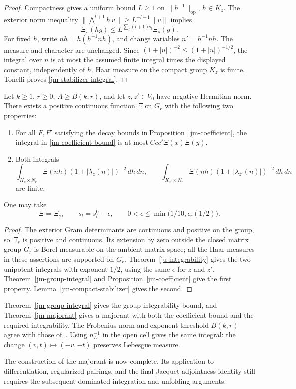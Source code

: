 \begin{proof}
Compactness gives a uniform bound \(L\geq1\) on
\(\|h^{-1}\|_{\mathrm{op}}\), \(h\in K_z\).
The exterior norm inequality
\(\|\bigwedge^{l+1}h\,v\|\geq L^{-l-1}\|v\|\)
implies
\[
          \Xi_s(hg)\leq L^{\sum_l(l+1)s_l}\Xi_s(g).
\]
For fixed \(h\), write \(nh=h(h^{-1}nh)\), and change
variables \(n'=h^{-1}nh\).  The measure and character are
unchanged.  Since
\((1+|u|)^{-2}\leq(1+|u|)^{-1/2}\), the integral over \(n\)
is at most the assumed finite integral times the displayed
constant, independently of \(h\).
Haar measure on the compact group \(K_z\) is finite.
Tonelli proves \eqref{jm-stabilizer-integral}.
\end{proof}

\begin{theorem}\label{jm-majorant}
Let \(k\geq1\), \(r\geq0\), \(A\geq B(k,r)\), and let
\(z,z'\in V_0\) have negative Hermitian norm.
There exists a positive continuous function \(\Xi\) on \(G_r\)
with the following two properties:
\begin{enumerate}
 \item For all \(F,F'\) satisfying the decay bounds in
 Proposition~\ref{jm-coefficient}, the integral in
 \eqref{jm-coefficient-bound} is at most
 \(Ccc'\Xi(x)\Xi(y)\).
 \item Both integrals
 \[
 \int_{K_z\times N_r}\Xi(nh)(1+|\lambda_z(n)|)^{-2}\,dh\,dn,
 \qquad
 \int_{K_{z'}\times N_r}
             \Xi(nh)(1+|\lambda_{z'}(n)|)^{-2}\,dh\,dn
 \]
 are finite.
\end{enumerate}
One may take
\[
 \Xi=\Xi_s,\qquad
 s_l=s_l^0-\epsilon,\qquad
 0<\epsilon\leq\min\bigl(1/10,\epsilon_r(1/2)\bigr).
\]
\end{theorem}

\begin{proof}
The exterior Gram determinants are continuous and positive
on the group, so \(\Xi_s\) is positive and continuous.
Its extension by zero outside the closed matrix group \(G_r\)
is Borel measurable on the ambient matrix space; all the Haar
measures in these assertions are supported on \(G_r\).
Theorem~\ref{ju-integrability} gives the two unipotent
integrals with exponent \(1/2\), using the same \(\epsilon\)
for \(z\) and \(z'\).
Theorem~\ref{jm-group-integral} and
Proposition~\ref{jm-coefficient} give the first property.
Lemma~\ref{jm-compact-stabilizer} gives the second.
\end{proof}

Theorem~\ref{jm-group-integral} gives the group-integrability
bound, and Theorem~\ref{jm-majorant} gives a majorant with both
the coefficient bound and the required integrability.
The Frobenius norm and exponent threshold \(B(k,r)\) agree with
those of~\cite{alpo-uniform-source}.  Using \(n_L^{-1}\) in the
open cell gives the same integral: the change
\((v,t)\mapsto(-v,-t)\) preserves Lebesgue measure.

The construction of the majorant is now complete.
Its application to differentiation, regularized pairings,
and the final Jacquet adjointness identity still requires
the subsequent dominated integration and unfolding arguments.


